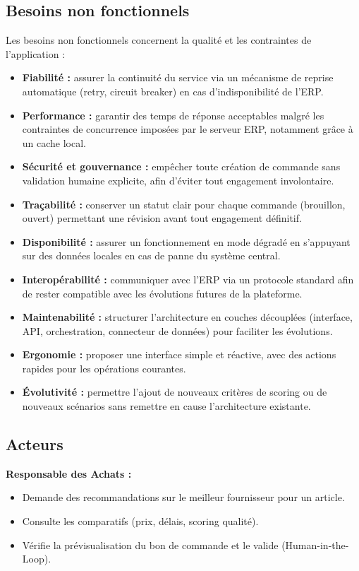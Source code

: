 \subsection{Besoins non fonctionnels}
Les besoins non fonctionnels concernent la qualité et les contraintes de l'application :
\begin{itemize}
    \item \textbf{Fiabilité :} assurer la continuité du service via un mécanisme de reprise automatique (retry, circuit breaker) en cas d'indisponibilité de l'ERP.
    \item \textbf{Performance :} garantir des temps de réponse acceptables malgré les contraintes de concurrence imposées par le serveur ERP, notamment grâce à un cache local.
    \item \textbf{Sécurité et gouvernance :} empêcher toute création de commande sans validation humaine explicite, afin d'éviter tout engagement involontaire.
    \item \textbf{Traçabilité :} conserver un statut clair pour chaque commande (brouillon, ouvert) permettant une révision avant tout engagement définitif.
    \item \textbf{Disponibilité :} assurer un fonctionnement en mode dégradé en s'appuyant sur des données locales en cas de panne du système central.
    \item \textbf{Interopérabilité :} communiquer avec l'ERP via un protocole standard afin de rester compatible avec les évolutions futures de la plateforme.
    \item \textbf{Maintenabilité :} structurer l'architecture en couches découplées (interface, API, orchestration, connecteur de données) pour faciliter les évolutions.
    \item \textbf{Ergonomie :} proposer une interface simple et réactive, avec des actions rapides pour les opérations courantes.
    \item \textbf{Évolutivité :} permettre l'ajout de nouveaux critères de scoring ou de nouveaux scénarios sans remettre en cause l'architecture existante.
\end{itemize}

\subsection{Acteurs}

\textbf{Responsable des Achats :}
\begin{itemize}
    \item Demande des recommandations sur le meilleur fournisseur pour un article.
    \item Consulte les comparatifs (prix, délais, scoring qualité).
    \item Vérifie la prévisualisation du bon de commande et le valide (Human-in-the-Loop).
\end{itemize}

